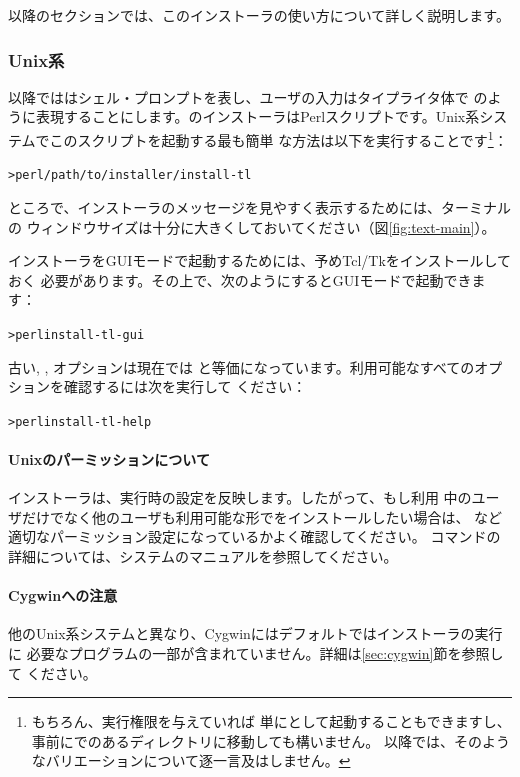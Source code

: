 \documentclass[uplatex,dvipdfmx,12pt,tombow]{jsarticle}
\begin{document}
以降のセクションでは、このインストーラの使い方について詳しく説明します。

\subsubsection{Unix系}

以降では\code{>}はシェル・プロンプトを表し、ユーザの入力はタイプライタ体で
のように表現することにします。\TL のインストーラはPerlスクリプトです。Unix系システムでこのスクリプトを起動する最も簡単
な方法は以下を実行することです\footnote{もちろん、実行権限を与えていれば
単にとして起動することもできますし、
事前にでのあるディレクトリに移動しても構いません。
以降では、そのようなバリエーションについて逐一言及はしません。}：
%
\begin{alltt}
> perl /path/to/installer/install-tl
\end{alltt}
%
ところで、インストーラのメッセージを見やすく表示するためには、ターミナルの
ウィンドウサイズは十分に大きくしておいてください（図\ref{fig:text-main}）。

インストーラをGUIモードで起動するためには、予めTcl/Tkをインストールしておく
必要があります。その上で、次のようにするとGUIモードで起動できます：
%
\begin{alltt}
> perl install-tl -gui
\end{alltt}

古い, , オプションは現在では%
と等価になっています。利用可能なすべてのオプションを確認するには次を実行して
ください：
%
\begin{alltt}
> perl install-tl -help
\end{alltt}

\paragraph{Unixのパーミッションについて}
\TL インストーラは、実行時の設定を反映します。したがって、もし利用
中のユーザだけでなく他のユーザも利用可能な形で\TL をインストールしたい場合は、
など適切なパーミッション設定になっているかよく確認してください。
コマンドの詳細については、システムのマニュアルを参照してください。

\paragraph{Cygwinへの注意}
他のUnix系システムと異なり、Cygwinにはデフォルトでは\TL インストーラの実行に
必要なプログラムの一部が含まれていません。詳細は\ref{sec:cygwin}節を参照して
ください。
\end{document}
